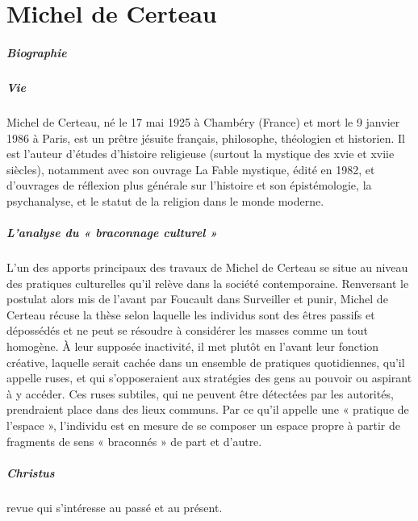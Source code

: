 \chapter{Michel de Certeau}



\paragraph{Biographie}

\paragraph{Vie } Michel de Certeau, né le 17 mai 1925 à Chambéry (France) et mort le 9 janvier 1986 à Paris, est un prêtre jésuite français, philosophe, théologien et historien. Il est l'auteur d'études d'histoire religieuse (surtout la mystique des xvie et xviie siècles), notamment avec son ouvrage La Fable mystique, édité en 1982, et d'ouvrages de réflexion plus générale sur l'histoire et son épistémologie, la psychanalyse, et le statut de la religion dans le monde moderne.

\paragraph{L'analyse du « braconnage culturel »}

L'un des apports principaux des travaux de Michel de Certeau se situe au niveau des pratiques culturelles qu'il relève dans la société contemporaine. Renversant le postulat alors mis de l'avant par Foucault dans Surveiller et punir, Michel de Certeau récuse la thèse selon laquelle les individus sont des êtres passifs et dépossédés et ne peut se résoudre à considérer les masses comme un tout homogène. À leur supposée inactivité, il met plutôt en l'avant leur fonction créative, laquelle serait cachée dans un ensemble de pratiques quotidiennes, qu'il appelle ruses, et qui s'opposeraient aux stratégies des gens au pouvoir ou aspirant à y accéder. Ces ruses subtiles, qui ne peuvent être détectées par les autorités, prendraient place dans des lieux communs. Par ce qu'il appelle une « pratique de l'espace », l'individu est en mesure de se composer un espace propre à partir de fragments de sens « braconnés » de part et d'autre.

\paragraph{Christus} revue qui s'intéresse au passé et au présent.

